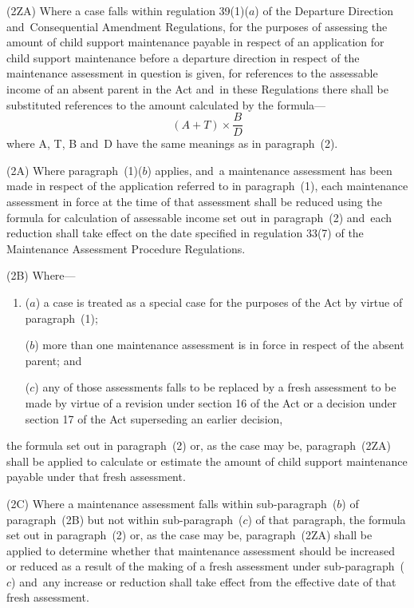 \documentclass[12pt,a4paper]{article}
\begin{document}
(2ZA) Where a case falls within regulation 39(1)($a$) of the Departure Direction
and~Consequential Amendment Regulations, for the purposes of assessing the
amount of child support maintenance payable in respect of an application for
child support maintenance before a departure direction in respect of the
maintenance assessment in question is given, for references to the assessable
income of an absent parent in the Act and~in these Regulations there shall be
substituted references to the amount calculated by the formula—
\[(A + T) \times \frac{B}{D}\]
where A, T, B and~D have the same meanings as in paragraph~(2).

(2A) Where paragraph~(1)($b$) applies, and~a maintenance assessment has been made in respect of the application referred to in paragraph~(1), each maintenance assessment in force at the time of that assessment shall be reduced using the formula for calculation of assessable income set out in paragraph~(2) and~each reduction shall take effect on the date specified in regulation 33(7) of the Maintenance Assessment Procedure Regulations.

(2B) Where—
\begin{enumerate}\item[]
($a$) a case is treated as a special case for the purposes of the Act by virtue of paragraph~(1);

($b$) more than one maintenance assessment is in force in respect of the absent parent; and


($c$) any of those assessments falls to be replaced by a fresh assessment to be made by virtue of a revision under section 16 of the Act or a decision under section 17 of the Act superseding an earlier decision,
\end{enumerate}
the formula set out in paragraph~(2) or, as the case may be, paragraph~(2ZA) shall be applied to calculate or estimate the amount of child support maintenance payable under that fresh assessment.

(2C) Where a maintenance assessment falls within sub-\hspace{0pt}paragraph~($b$) of paragraph~(2B) but 
not within  %
sub-paragraph~($c$) of that paragraph, the formula set out in paragraph~(2) or, as the case may be, paragraph~(2ZA) shall be applied to determine whether that maintenance assessment should be increased or reduced as a result of the making of a fresh assessment under sub-paragraph~($c$) and~any increase or reduction shall take effect from the effective date of that fresh assessment.
\end{document}

